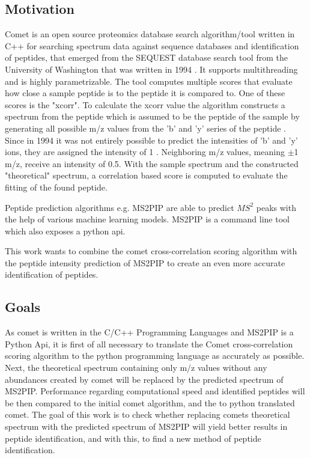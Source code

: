 \documentclass[12pt]{article}
\begin{document}
\subsection{Motivation}
Comet is an open source proteomics database search algorithm/tool written in C++ for searching spectrum data against sequence databases and identification of peptides, that emerged from the SEQUEST database search tool from the University of Washington that was written in 1994 \cite{comet-search-tool}. It supports multithreading and is highly parametrizable. The tool computes multiple scores that evaluate how close a sample peptide is to the peptide it is compared to. One of these scores is the "xcorr". To calculate the xcorr value the algorithm constructs a spectrum from the peptide which is assumed to be the peptide of the sample by generating all possible m/z values from the 'b' and 'y' series of the peptide \cite{comet-first-paper}. Since in 1994 it was not entirely possible to predict the intensities of 'b' and 'y' ions, they are assigned the intensity of 1 \cite{deeper-look-into-comet}. Neighboring m/z values, meaning $\pm$1 m/z, receive an intensity of 0.5. With the sample spectrum and the constructed "theoretical" spectrum, a correlation based score is computed
to evaluate the fitting of the found peptide.

Peptide prediction algorithms e.g. MS2PIP\cite{ms2pip} are able to predict \(MS^2\) peaks with the help of various machine learning models.
MS2PIP is a command line tool which also exposes a python api.

This work wants to combine the comet cross-correlation scoring algorithm
with the peptide intensity prediction of MS2PIP to create an even more accurate identification of peptides.


\subsection{Goals}
As comet is written in the C/C++ Programming Languages and MS2PIP is a Python Api, it is first of all necessary to translate the Comet cross-correlation scoring algorithm to the python programming language as accurately as possible. Next, the theoretical spectrum containing only m/z values without any abundances created by comet will be replaced by the predicted spectrum of MS2PIP. Performance regarding computational speed and identified peptides will be then compared to the initial comet algorithm, and the to python translated comet.
The goal of this work is to check whether replacing comets theoretical spectrum with the predicted spectrum of MS2PIP will yield better results in peptide identification, and with this, to find a new method of peptide identification.
\end{document}
